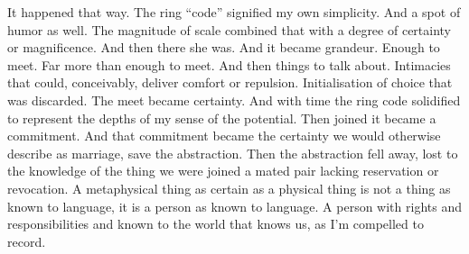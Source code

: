 

It happened that way.  The ring ``code'' signified my own simplicity.
And a spot of humor as well.  The magnitude of scale combined that
with a degree of certainty or magnificence.  And then there she was.
And it became grandeur.  Enough to meet.  Far more than enough to
meet.  And then things to talk about.  Intimacies that could,
conceivably, deliver comfort or repulsion.  Initialisation of choice
that was discarded.  The meet became certainty.  And with time the
ring code solidified to represent the depths of my sense of the
potential.  Then joined it became a commitment.  And that commitment
became the certainty we would otherwise describe as marriage, save the
abstraction.  Then the abstraction fell away, lost to the knowledge of
the thing we were joined a mated pair lacking reservation or
revocation.  A metaphysical thing as certain as a physical thing is
not a thing as known to language, it is a person as known to language.
A person with rights and responsibilities and known to the world that
knows us, as I'm compelled to record.

\bye
